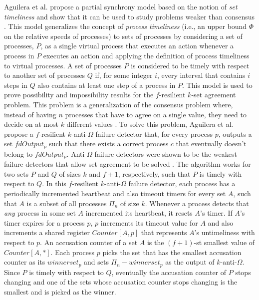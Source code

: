Aguilera et al. propose a partial synchrony model based on the notion of \textit{set timeliness} and show that it can be used to study problems weaker than consensus \cite{Aguilera2012}. This model generalizes the concept of \textit{process timeliness} (i.e., an upper bound $\Phi$ on the relative speeds of processes) \cite{Dwork1988} to sets of processes by considering a set of processes, $P$, as a single virtual process that executes an action whenever a process in $P$ executes an action and applying the definition of process timeliness to virtual processes. A set of processes $P$ is considered to be timely with respect to another set of processes $Q$ if, for some integer $i$, every interval that contains $i$ steps in $Q$ also contains at least one step of a process in $P$. This model is used to prove possibility and impossibility results for the $f$-resilient $k$-set agreement problem. This problem is a generalization of the consensus problem where, instead of having $n$ processes that have to agree on a single value, they need to decide on at most $k$ different values \cite{Chaudhuri1993}. To solve this problem, Aguilera et al. propose a $f$-resilient $k$-anti-$\Omega$ failure detector that, for every process $p$, outputs a set $fdOutput_p$ such that there exists a correct process $c$ that eventually doesn't belong to $fdOutput_p$. Anti-$\Omega$ failure detectors were shown to be the weakest failure detectors that allow set agreement to be solved \cite{Zielinski2010}. The algorithm works for two sets $P$ and $Q$ of sizes $k$ and $f+1$, respectively, such that $P$ is timely with respect to $Q$. In this $f$-resilient $k$-anti-$\Omega$ failure detector, each process has a periodically incremented heartbeat and also timeout timers for every set $A$, such that $A$ is a subset of all processes $\Pi_n$ of size $k$. Whenever a process detects that \textit{any} process in some set $A$ incremented its heartbeat, it resets $A$'s timer. If $A$'s timer expires for a process $p$, $p$ increments its timeout value for $A$ and also increments a shared register $Counter[A,p]$ that represents $A$'s untimeliness with respect to $p$. An accusation counter of a set $A$ is the $(f+1)$-st smallest value of $Counter[A,*]$. Each process $p$ picks the set that has the smallest accusation counter as its $winnerset_p$ and sets $\Pi_n - winnerset_p$ as the output of $k$-anti-$\Omega$. Since $P$ is timely with respect to $Q$, eventually the accusation counter of $P$ stops changing and one of the sets whose accusation counter stops changing is the smallest and is picked as the winner. \par

